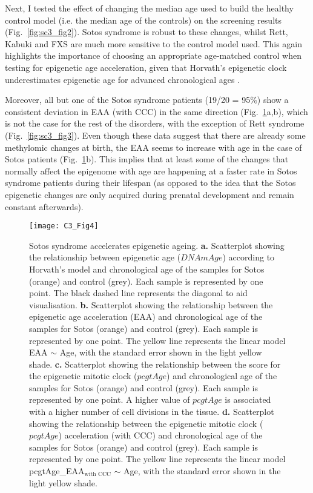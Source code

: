Next, I tested the effect of changing the median age used to build the healthy control model (i.e. the median age of the controls) on the screening results (Fig.~\ref{fig:sc3_fig2}). Sotos syndrome is robust to these changes, whilst Rett, Kabuki and FXS are much more sensitive to the control model used. This again highlights the importance of choosing an appropriate age-matched control when testing for epigenetic age acceleration, given that Horvath’s epigenetic clock underestimates epigenetic age for advanced chronological ages \cite{ElKhoury2018,Marioni2018}.

\bigskip

Moreover, all but one of the Sotos syndrome patients (19/20 = 95\%) show a consistent deviation in EAA (with CCC) in the same direction (Fig.~\ref{fig:c3_fig4}a,b), which is not the case for the rest of the disorders, with the exception of Rett syndrome (Fig.~\ref{fig:sc3_fig3}). Even though these data suggest that there are already some methylomic changes at birth, the EAA seems to increase with age in the case of Sotos patients (Fig.~\ref{fig:c3_fig4}b). This implies that at least some of the changes that normally affect the epigenome with age are happening at a faster rate in Sotos syndrome patients during their lifespan (as opposed to the idea that the Sotos epigenetic changes are only acquired during prenatal development and remain constant afterwards).

\begin{figure}[htbp!] 
	\centering    
	\texttt{[image: C3\_Fig4]}
	\caption[Sotos syndrome accelerates epigenetic ageing]{Sotos syndrome accelerates epigenetic ageing. \textbf{a.} Scatterplot showing the relationship between epigenetic age ($DNAmAge$) according to Horvath’s model \cite{Horvath2013} and chronological age of the samples for Sotos (orange) and control (grey). Each sample is represented by one point. The black dashed line represents the diagonal to aid visualisation. \textbf{b.} Scatterplot showing the relationship between the epigenetic age acceleration (EAA) and chronological age of the samples for Sotos (orange) and control (grey). Each sample is represented by one point. The yellow line represents the linear model EAA $\sim$ Age, with the standard error shown in the light yellow shade. \textbf{c.} Scatterplot showing the relationship between the score for the epigenetic mitotic clock ($pcgtAge$) \cite{Yang2016} and chronological age of the samples for Sotos (orange) and control (grey). Each sample is represented by one point. A higher value of $pcgtAge$ is associated with a higher number of cell divisions in the tissue. \textbf{d.} Scatterplot showing the relationship between the epigenetic mitotic clock ($pcgtAge$) acceleration (with CCC) and chronological age of the samples for Sotos (orange) and control (grey). Each sample is represented by one point. The yellow line represents the linear model pcgtAge\_EAA$_{\text{with CCC}}$ $\sim$ Age, with the standard error shown in the light yellow shade.}
	\label{fig:c3_fig4}
\end{figure}

